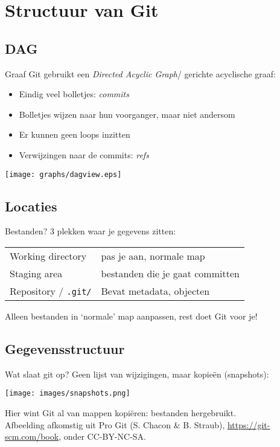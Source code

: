\section[Structuur]{Structuur van Git}
\subsection{DAG}
\begin{frame}{Graaf}
	Git gebruikt een \emph{Directed Acyclic Graph}/ gerichte acyclische graaf:
	\begin{itemize}
		\item Eindig veel bolletjes: \emph{commits}
		\item Bolletjes wijzen naar hun voorganger, maar niet andersom
		\item Er kunnen geen loops inzitten
		\item Verwijzingen naar de commits: \emph{refs}
	\end{itemize}

	\begin{center}
		\texttt{[image: graphs/dagview.eps]}
	\end{center}
\end{frame}

\subsection{Locaties}
\begin{frame}{Bestanden?}
	3 plekken waar je gegevens zitten:\\
	\vspace{.5cm}
	\begin{tabular}{ll}
		 Working directory			& pas je aan, normale map\\
		 Staging area				& bestanden die je gaat committen\\
		 Repository / \texttt{.git/}&Bevat metadata, objecten
	\end{tabular}
	Alleen bestanden in `normale' map aanpassen, rest doet Git voor je!
\end{frame}

\subsection{Gegevensstructuur}
\begin{frame}{Wat slaat git op?}
	Geen lijst van wijzigingen, maar kopie\"en (snapshots):
	\begin{center}
		\texttt{[image: images/snapshots.png]}
	\end{center}
	{\footnotesize Hier wint Git al van mappen kopi\"eren: bestanden hergebruikt. } \\
	{\tiny Afbeelding afkomstig uit Pro Git (S. Chacon \& B. Straub), \url{https://git-scm.com/book}, onder CC-BY-NC-SA.}
\end{frame}

